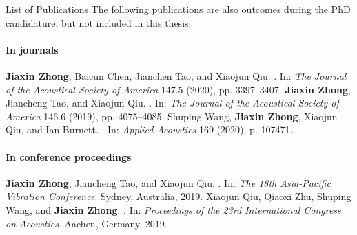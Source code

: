 \documentclass[
    11pt, %
    english, %
    onehalfspacing, %
    headsepline, %
]{MastersDoctoralThesis} %
\begin{document}
\begin{frontmatterpage}{List of Publications}
    The following publications are also outcomes during the PhD candidature, but not included in this thesis:
    \noindent \paragraph{In journals}
    \begin{outline}[enumerate]
        \1 \textbf{Jiaxin Zhong}, Baicun Chen, Jianchen Tao, and Xiaojun Qiu. . In: \textit{The Journal of the Acoustical Society of America} 147.5 (2020), pp. 3397--3407.
        \1 \textbf{Jiaxin Zhong}, Jiancheng Tao, and Xiaojun Qiu. . In: \textit{The Journal of the Acoustical Society of America} 146.6 (2019), pp. 4075--4085.
        \1 Shuping Wang, \textbf{Jiaxin Zhong}, Xiaojun Qiu, and Ian Burnett. . In: \textit{Applied Acoustics} 169 (2020), p. 107471.
    \end{outline}
    \noindent \paragraph{In conference proceedings}
    \begin{outline}[enumerate]
        \1 \textbf{Jiaxin Zhong}, Jiancheng Tao, and Xiaojun Qiu. . In: \textit{The 18th Asia-Pacific Vibration Conference}. Sydney, Australia, 2019.
        \1 Xiaojun Qiu, Qiaoxi Zhu, Shuping Wang, and \textbf{Jiaxin Zhong}. . In: \textit{Proceedings of the 23rd International Congress on Acoustics}. Aachen, Germany, 2019.
    \end{outline}
\end{frontmatterpage}

\end{document}
